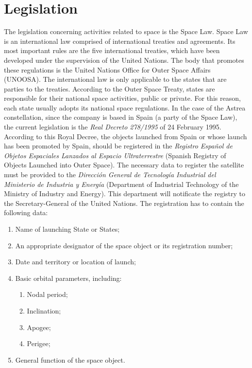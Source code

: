 \section{Legislation}
The legislation concerning activities related to space is the Space Law. Space Law is an international law comprised of international treaties and agreements. Its most important rules are the five international treaties, which have been developed under the supervision of the United Nations. The body that promotes these regulations is the United Nations Office for Outer Space Affairs (UNOOSA).
\newline
\newline
The international law is only applicable to the states that are parties to the treaties. According to the Outer Space Treaty, states are responsible for their national space activities, public or private. For this reason, each state usually adopts its national space regulations.
\newline
\newline
In the case of the Astrea constellation, since the company is based in Spain (a party of the Space Law), the current legislation is the \textit{Real Decreto 278/1995} of 24 February 1995. According to this Royal Decree, the objects launched from Spain or whose launch has been promoted by Spain, should be registered in the \textit{Registro Español de Objetos Espaciales Lanzados al Espacio Ultraterrestre} (Spanish Registry of Objects Launched into Outer Space). The necessary data to register the satellite must be provided to the \textit{Dirección General de Tecnología Industrial del Ministerio de Industria y Energía} (Department of Industrial Technology of the Ministry of Industry and Energy). This department will notificate the registry to the Secretary-General of the United Nations.
\newline
\newline
The registration has to contain the following data:
\begin{enumerate}[label=\alph*)]
\item Name of launching State or States;
\item An appropriate designator of the space object or its registration number;
\item Date and territory or location of launch;
\item Basic orbital parameters, including:
\begin{enumerate}[label=\Roman*)]
\item Nodal period;
\item Inclination;
\item Apogee;
\item Perigee;
\end{enumerate}
\item General function of the space object.
\end{enumerate}

